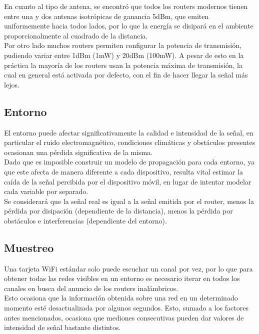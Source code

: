 \documentclass[journal]{IEEEtran}
\begin{document}
En cuanto al tipo de antena, se encontró que todos los routers modernos tienen entre una y dos antenas isotrópicas de ganancia 5dBm, que emiten uniformemente hacia todos lados, por lo que la energía se disipará en el ambiente proporcionalmente al cuadrado de la distancia.\\

Por otro lado muchos routers permiten configurar la potencia de transmisión, pudiendo variar entre 1dBm (1mW) y 20dBm (100mW). A pesar de esto en la práctica la mayoría de los routers usan la potencia máxima de transmisión, la cual en general está activada por defecto, con el fin de hacer llegar la señal más lejos.\\

\subsection{Entorno}

El entorno puede afectar significativamente la calidad e intensidad de la señal, en particular el ruido electromagnético, condiciones climáticas y obstáculos presentes ocasionan una pérdida significativa de la misma.\\

Dado que es imposible construir un modelo de propagación para cada entorno, ya que este afecta de manera diferente a cada dispositivo, resulta vital estimar la caída de la señal percibida por el dispositivo móvil, en lugar de intentar modelar cada variable por separado.\\

Se considerará que la señal real es igual a la señal emitida por el router, menos la pérdida por disipación (dependiente de la distancia), menos la pérdida por obstáculos e interferencias (dependiente del entorno).\\

\subsection{Muestreo}

Una tarjeta WiFi estándar solo puede escuchar un canal por vez, por lo que para obtener todas las redes visibles en un entorno es necesario iterar en todos los canales en busca del anuncio de los routers inalámbricos.\\

Esto ocasiona que la información obtenida sobre una red en un determinado momento esté desactualizada por algunos segundos. Esto, sumado a los factores antes mencionados, ocasiona que mediones consecutivas pueden dar valores de intensidad de señal bastante distintos.\\
\end{document}
